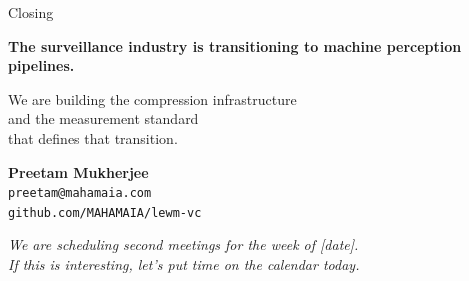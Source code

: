 \documentclass[aspectratio=169, professionalfonts, 10pt]{beamer}
\begin{document}
\begin{frame}{Closing}

  \begin{center}
    \vspace{1em}
    {\Large\bfseries The surveillance industry is transitioning to machine perception pipelines.}

    \bigskip
    {\Large We are building the compression infrastructure\\
          and the measurement standard\\
          that defines that transition.}

    \vspace{2em}
    \textbf{Preetam Mukherjee} \\
    \texttt{preetam@mahamaia.com} \\
    \texttt{github.com/MAHAMAIA/lewm-vc}

    \vspace{1.5em}
    \textit{We are scheduling second meetings for the week of [date].\\
    If this is interesting, let's put time on the calendar today.}
  \end{center}
\end{frame}
\end{document}

